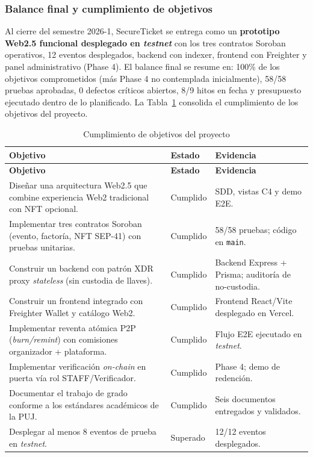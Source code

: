 \documentclass[12pt,oneside]{report}
\newcommand{\projectname}{SecureTicket}
\begin{document}
      \subsubsection{Balance final y cumplimiento de objetivos}
      Al cierre del semestre 2026-1, \projectname{} se entrega como un \textbf{prototipo Web2.5 funcional desplegado en \textit{testnet}} con los tres contratos Soroban operativos, 12 eventos desplegados, backend con indexer, frontend con Freighter y panel administrativo (Phase 4). El balance final se resume en: 100\% de los objetivos comprometidos (más Phase 4 no contemplada inicialmente), 58/58 pruebas aprobadas, 0 defectos críticos abiertos, 8/9 hitos en fecha y presupuesto ejecutado dentro de lo planificado. La Tabla~\ref{tab:cumplimiento-objetivos} consolida el cumplimiento de los objetivos del proyecto.

      \begin{longtable}{@{}p{8.5cm} p{2.2cm} p{4.0cm}@{}}
        \caption{Cumplimiento de objetivos del proyecto}
        \label{tab:cumplimiento-objetivos}\\
        \toprule
        \textbf{Objetivo} & \textbf{Estado} & \textbf{Evidencia}\\
        \midrule
        \endfirsthead
        \toprule
        \textbf{Objetivo} & \textbf{Estado} & \textbf{Evidencia}\\
        \midrule
        \endhead
        \bottomrule
        \endfoot
        Diseñar una arquitectura Web2.5 que combine experiencia Web2 tradicional con NFT opcional. & Cumplido & SDD, vistas C4 y demo E2E.\\
        Implementar tres contratos Soroban (evento, factoría, NFT SEP-41) con pruebas unitarias. & Cumplido & 58/58 pruebas; código en \texttt{main}.\\
        Construir un backend con patrón XDR proxy \textit{stateless} (sin custodia de llaves). & Cumplido & Backend Express + Prisma; auditoría de no-custodia.\\
        Construir un frontend integrado con Freighter Wallet y catálogo Web2. & Cumplido & Frontend React/Vite desplegado en Vercel.\\
        Implementar reventa atómica P2P (\textit{burn/remint}) con comisiones organizador + plataforma. & Cumplido & Flujo E2E ejecutado en \textit{testnet}.\\
        Implementar verificación \textit{on-chain} en puerta vía rol STAFF/Verificador. & Cumplido & Phase 4; demo de redención.\\
        Documentar el trabajo de grado conforme a los estándares académicos de la PUJ. & Cumplido & Seis documentos entregados y validados.\\
        Desplegar al menos 8 eventos de prueba en \textit{testnet}. & Superado & 12/12 eventos desplegados.\\
      \end{longtable}
\end{document}
